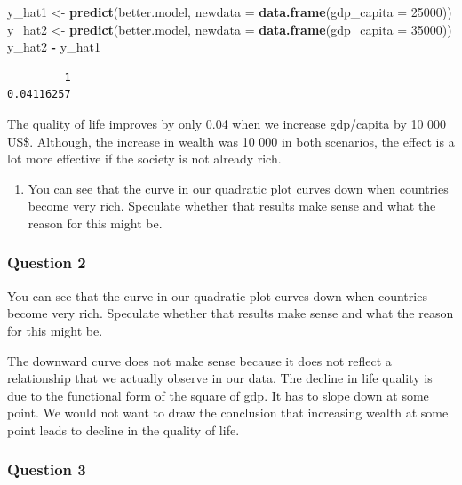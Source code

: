 \documentclass[]{article}
\newenvironment{Shaded}{\begin{snugshade}}{\end{snugshade}}
\newcommand{\KeywordTok}[1]{\textcolor[rgb]{0.13,0.29,0.53}{\textbf{#1}}}
\newcommand{\DataTypeTok}[1]{\textcolor[rgb]{0.13,0.29,0.53}{#1}}
\newcommand{\DecValTok}[1]{\textcolor[rgb]{0.00,0.00,0.81}{#1}}
\newcommand{\StringTok}[1]{\textcolor[rgb]{0.31,0.60,0.02}{#1}}
\newcommand{\OperatorTok}[1]{\textcolor[rgb]{0.81,0.36,0.00}{\textbf{#1}}}
\newcommand{\NormalTok}[1]{#1}
\providecommand{\tightlist}{%
  \setlength{\itemsep}{0pt}\setlength{\parskip}{0pt}}
\theoremstyle{definition}
\theoremstyle{definition}
\theoremstyle{definition}
\theoremstyle{remark}
\begin{document}
\begin{Shaded}
\begin{Highlighting}[]
\NormalTok{y_hat1 <-}\StringTok{ }\KeywordTok{predict}\NormalTok{(better.model, }\DataTypeTok{newdata =} \KeywordTok{data.frame}\NormalTok{(}\DataTypeTok{gdp_capita =} \DecValTok{25000}\NormalTok{))}
\NormalTok{y_hat2 <-}\StringTok{ }\KeywordTok{predict}\NormalTok{(better.model, }\DataTypeTok{newdata =} \KeywordTok{data.frame}\NormalTok{(}\DataTypeTok{gdp_capita =} \DecValTok{35000}\NormalTok{))}
\NormalTok{y_hat2 }\OperatorTok{-}\StringTok{ }\NormalTok{y_hat1}
\end{Highlighting}
\end{Shaded}

\begin{verbatim}
         1 
0.04116257 
\end{verbatim}

The quality of life improves by only 0.04 when we increase gdp/capita by
10 000 US\$. Although, the increase in wealth was 10 000 in both
scenarios, the effect is a lot more effective if the society is not
already rich.

\begin{enumerate}
\def\labelenumi{\arabic{enumi}.}
\setcounter{enumi}{1}
\tightlist
\item
  You can see that the curve in our quadratic plot curves down when
  countries become very rich. Speculate whether that results make sense
  and what the reason for this might be.
\end{enumerate}

\subsubsection{Question 2}\label{question-2}

You can see that the curve in our quadratic plot curves down when
countries become very rich. Speculate whether that results make sense
and what the reason for this might be.

The downward curve does not make sense because it does not reflect a
relationship that we actually observe in our data. The decline in life
quality is due to the functional form of the square of gdp. It has to
slope down at some point. We would not want to draw the conclusion that
increasing wealth at some point leads to decline in the quality of life.

\subsubsection{Question 3}\label{question-3}
\end{document}
